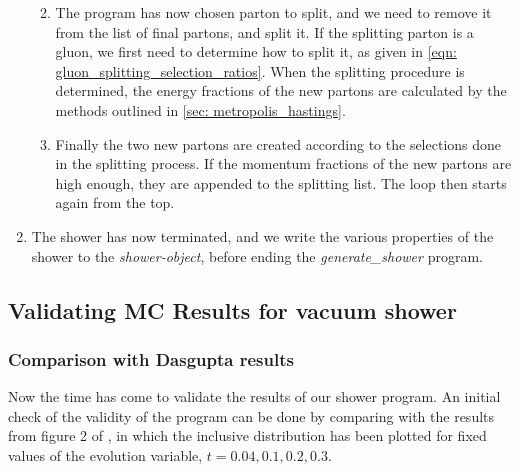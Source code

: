 \documentclass[main.tex]{subfiles}
\begin{document}
\begin{enumerate}[Step 1:]
\begin{enumerate}[{while} i)]
\begin{itemize}
    \end{itemize}
    \item The program has now chosen parton to split, and we need to remove it from the list of final partons, and split it. If the splitting parton is a gluon, we first need to determine how to split it, as given in \autoref{eqn: gluon_splitting_selection_ratios}. When the splitting procedure is determined, the energy fractions of the new partons are calculated by the methods outlined in \autoref{sec: metropolis_hastings}.
    \item Finally the two new partons are created according to the selections done in the splitting process. If the momentum fractions of the new partons are high enough, they are appended to the splitting list. The loop then starts again from the top.
    \end{enumerate}
\item The shower has now terminated, and we write the various properties of the shower to the \textit{shower-object}, before ending the \textit{generate\_shower} program.
\end{enumerate}

\subsection{Validating MC Results for vacuum shower}
\subsubsection{Comparison with Dasgupta results}
Now the time has come to validate the results of our shower program. An initial check of the validity of the program can be done by comparing with the results from figure 2 of \cite{Dasgupta_2015}, in which the inclusive distribution has been plotted for fixed values of the evolution variable, \( t = 0.04, 0.1, 0.2, 0.3\).
\end{document}

